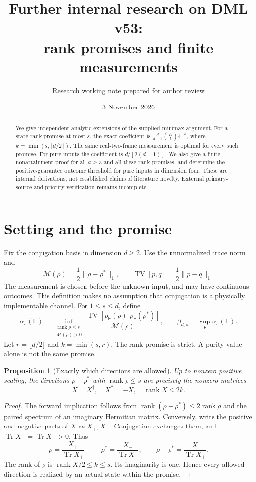 \documentclass[11pt]{article}
\title{Further internal research on DML v53:\\rank promises and finite measurements}
\author{Research working note prepared for author review}
\date{3 November 2026}
\newtheorem{proposition}{Proposition}
\newcommand{\Tr}{\operatorname{Tr}}
\newcommand{\rank}{\operatorname{rank}}
\newcommand{\TV}{\operatorname{TV}}
\newcommand{\M}{\mathcal M}
\newcommand{\E}{\mathsf E}
\begin{document}
\maketitle
\begin{abstract}
We give independent analytic extensions of the supplied minimax argument.
For a state-rank promise at most $s$, the exact coefficient is
$\frac{d}{d-1}\binom{2k}{k}4^{-k}$, where
$k=\min(s,\lfloor d/2\rfloor)$.
The same real-two-frame measurement is optimal for every such promise.
For pure inputs the coefficient is $d/[2(d-1)]$.
We also give a finite-nonattainment proof for all $d\geq3$ and all these
rank promises, and determine the positive-guarantee outcome threshold
for pure inputs in dimension four.
These are internal derivations, not established claims of literature
novelty. External primary-source and priority verification remains incomplete.
\end{abstract}

\section{Setting and the promise}
Fix the conjugation basis in dimension $d\geq2$.
Use the unnormalized trace norm and
\[
\M(\rho)=\frac12\|\rho-\rho^*\|_1,\qquad
\TV[p,q]=\frac12\|p-q\|_1.
\]
The measurement is chosen before the unknown input, and may have continuous
outcomes. This definition makes no assumption that conjugation is a
physically implementable channel. For $1\leq s\leq d$, define
\[
\alpha_s(\E)=\inf_{\substack{\rank\rho\leq s\\\M(\rho)>0}}
\frac{\TV[p_{\E}(\rho),p_{\E}(\rho^*)]}{\M(\rho)},\qquad
\beta_{d,s}=\sup_{\E}\alpha_s(\E).
\]
Let $r=\lfloor d/2\rfloor$ and $k=\min(s,r)$.
The rank promise is strict. A purity value alone is not the same promise.

\begin{proposition}[Exactly which directions are allowed]
Up to nonzero positive scaling, the directions $\rho-\rho^*$ with
$\rank\rho\leq s$ are precisely the nonzero matrices
\[
X=X^\dagger,\quad X^*=-X,\quad \rank X\leq2k.
\]
\end{proposition}
\begin{proof}
The forward implication follows from
$\rank(\rho-\rho^*)\leq2\rank\rho$ and the paired spectrum of an
imaginary Hermitian matrix. Conversely, write the positive and negative
parts of $X$ as $X_+,X_-$. Conjugation exchanges them, and
$\Tr X_+=\Tr X_->0$. Thus
\[
\rho=\frac{X_+}{\Tr X_+},\qquad
\rho^*=\frac{X_-}{\Tr X_+},\qquad
\rho-\rho^*=\frac{X}{\Tr X_+}.
\]
The rank of $\rho$ is $\rank X/2\leq k\leq s$.
Its imaginarity is one. Hence every allowed direction is realized by
an actual state within the promise.
\end{proof}
\end{document}
